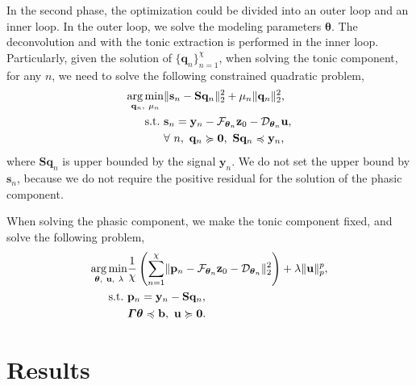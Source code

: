 \documentclass[10pt,conference]{ieeeconf}
\DeclareMathOperator*{\argmin}{arg\,min}
\begin{document}
In the second phase, the optimization could be divided into an outer loop and an inner loop. In the outer loop, we solve the modeling parameters $\boldsymbol{\theta}$. The deconvolution and with the tonic extraction is performed in the inner loop. Particularly, given the solution of $\{\mathbf{q}_n\}_{n=1}^{\chi}$, when solving the tonic component, for any $n$, we need to solve the following constrained quadratic problem,
\begin{subequations} \label{fml:the:second-tonic}
  \renewcommand{\theequation}
  {\theparentequation-\arabic{equation}}
  \begin{align}
    \argmin\limits_{\mathbf{q}_n,~\mu_n} & \lVert \mathbf{s}_n - \mathbf{S} \mathbf{q}_n \rVert^2_2 + \mu_n \lVert \mathbf{q}_n \rVert_2^2, \\
    \mathrm{s.t.}~& \mathbf{s}_n = \mathbf{y}_n - \mathcal{F}_{\boldsymbol{\theta}_n} \mathbf{z}_{0} - \mathcal{D}_{\boldsymbol{\theta}_n} \mathbf{u}, \label{fml:the:second-tonic-obj}\\
    & \forall~n,~\mathbf{q}_n \succcurlyeq \mathbf{0},~\mathbf{S}\mathbf{q}_n \preccurlyeq \mathbf{y}_n,
  \end{align}
\end{subequations}
%
where $\mathbf{S}\mathbf{q}_n$ is upper bounded by the signal $\mathbf{y}_n$. We do not set the upper bound by $\mathbf{s}_n$, because we do not require the positive residual for the solution of the phasic component.

When solving the phasic component, we make the tonic component fixed, and solve the following problem,
\begin{subequations} \label{fml:the:second-phasic}
  \renewcommand{\theequation}
  {\theparentequation-\arabic{equation}}
  \begin{align}
  \argmin\limits_{\boldsymbol{\theta},~\mathbf{u},~\lambda} & \frac{1}{\chi}  \left( \sum_{n=1}^{\chi} \lVert \mathbf{p}_n - \mathcal{F}_{\boldsymbol{\theta}_n} \mathbf{z}_{0} - \mathcal{D}_{\boldsymbol{\theta}_n} \rVert^2_2 \right) + \lambda \lVert \mathbf{u} \rVert_p^p, \\
  \mathrm{s.t.}~& \mathbf{p}_n = \mathbf{y}_n -  \mathbf{S} \mathbf{q}_n, \\
  & \boldsymbol{\Gamma} \boldsymbol{\theta} \preccurlyeq \mathbf{b},~ \mathbf{u} \succcurlyeq \mathbf{0}.
  \end{align}
\end{subequations}

\section{Results}
\end{document}
